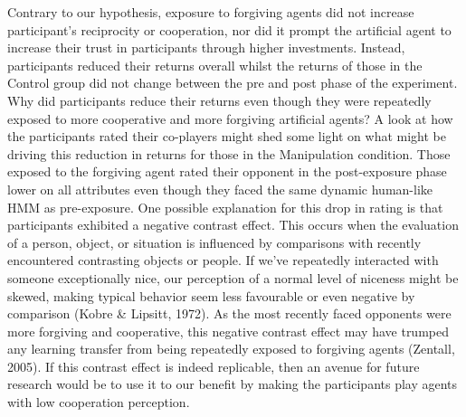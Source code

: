 \documentclass[
]{article}
\begin{document}
Contrary to our hypothesis, exposure to forgiving agents did not
increase participant's reciprocity or cooperation, nor did it prompt the
artificial agent to increase their trust in participants through higher
investments. Instead, participants reduced their returns overall whilst
the returns of those in the Control group did not change between the pre
and post phase of the experiment. Why did participants reduce their
returns even though they were repeatedly exposed to more cooperative and
more forgiving artificial agents? A look at how the participants rated
their co-players might shed some light on what might be driving this
reduction in returns for those in the Manipulation condition. Those
exposed to the forgiving agent rated their opponent in the post-exposure
phase lower on all attributes even though they faced the same dynamic
human-like HMM as pre-exposure. One possible explanation for this drop
in rating is that participants exhibited a negative contrast effect.
This occurs when the evaluation of a person, object, or situation is
influenced by comparisons with recently encountered contrasting objects
or people. If we've repeatedly interacted with someone exceptionally
nice, our perception of a normal level of niceness might be skewed,
making typical behavior seem less favourable or even negative by
comparison (Kobre \& Lipsitt, 1972). As the most recently faced opponents
were more forgiving and cooperative, this negative contrast effect may
have trumped any learning transfer from being repeatedly exposed to
forgiving agents (Zentall, 2005). If this contrast effect
is indeed replicable, then an avenue for future research would be to use
it to our benefit by making the participants play agents with low
cooperation perception.
\end{document}
